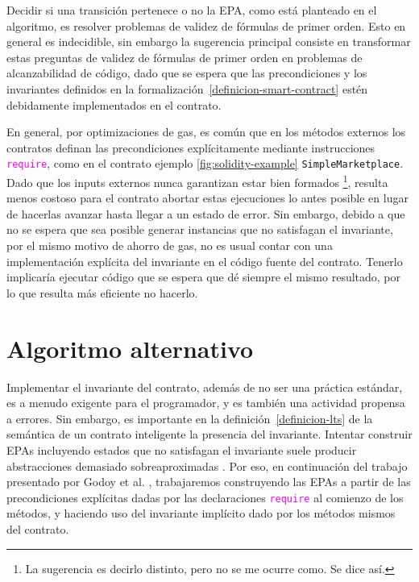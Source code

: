 Decidir si una transición pertenece o no la EPA, como está planteado en el algoritmo, es resolver problemas de validez de fórmulas de primer orden.
Esto en general es indecidible, sin embargo la sugerencia principal consiste en transformar estas preguntas de validez de fórmulas de primer orden en problemas de alcanzabilidad de código, dado que se espera que las precondiciones y los invariantes definidos en la formalización~\ref{definicion-smart-contract} estén debidamente implementados en el contrato.

En general, por optimizaciones de gas, es común que en los métodos externos los contratos definan las precondiciones explícitamente mediante instrucciones \textcolor{magenta}{\texttt{require}}, como en el contrato ejemplo \ref{fig:solidity-example} \texttt{SimpleMarketplace}.
Dado que los inputs externos nunca garantizan estar bien formados \footnote{La sugerencia es decirlo distinto, pero no se me ocurre como. Se dice así.}, resulta menos costoso para el contrato abortar estas ejecuciones lo antes posible en lugar de hacerlas avanzar hasta llegar a un estado de error.
Sin embargo, debido a que no se espera que sea posible generar instancias que no satisfagan el invariante, por el mismo motivo de ahorro de gas, no es usual contar con una implementación explícita del invariante en el código fuente del contrato.
Tenerlo implicaría ejecutar código que se espera que dé siempre el mismo resultado, por lo que resulta más eficiente no hacerlo.

\section{Algoritmo alternativo}
\label{sec:algoritmo-aternativo}
Implementar el invariante del contrato, además de no ser una práctica estándar, es a menudo exigente para el programador, y es también una actividad propensa a errores.
Sin embargo, es importante en la definición~\ref{definicion-lts} de la semántica de un contrato inteligente la  presencia del invariante.
Intentar construir EPAs incluyendo estados que no satisfagan el invariante suele producir abstracciones demasiado sobreaproximadas \cite{de-caso-epa}.
Por eso, en continuación del trabajo presentado por Godoy et al. \cite{predicate-abstraction-for-smart-contract-validation}, trabajaremos construyendo las EPAs a partir de las precondiciones explícitas dadas por las declaraciones \textcolor{magenta}{\texttt{require}} al comienzo de los métodos, y haciendo uso  del invariante implícito dado por los métodos mismos del contrato.


